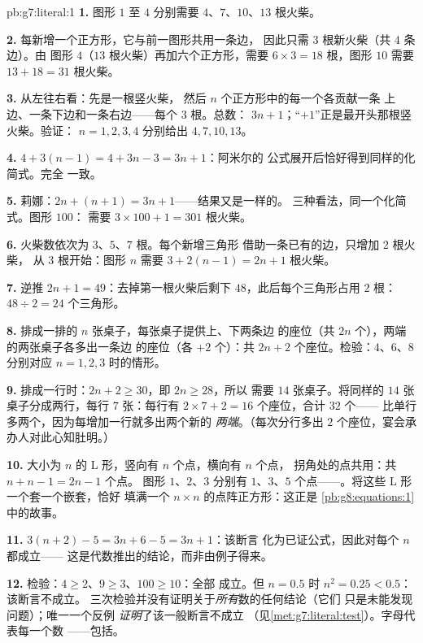 \begin{solution}{pb:g7:literal:1}
\textbf{1.} 图形 $1$ 至 $4$ 分别需要 $4$、$7$、$10$、$13$
根火柴。

\textbf{2.} 每新增一个正方形，它与前一图形共用一条边，
因此只需 $3$ 根新火柴（共 $4$ 条边）。由
图形 $4$（$13$ 根火柴）再加六个正方形，需要
$6 \times 3 = 18$ 根，图形 $10$ 需要 $13 + 18 = 31$ 根火柴。

\textbf{3.} 从左往右看：先是一根竖火柴，
然后 $n$ 个正方形中的每一个各贡献一条
上边、一条下边和一条右边——每个 $3$ 根。总数：
$3n + 1$；“$+1$”正是最开头那根竖火柴。验证：
$n = 1, 2, 3, 4$ 分别给出 $4, 7, 10, 13$。

\textbf{4.} $4 + 3(n - 1) = 4 + 3n - 3 = 3n + 1$：阿米尔的
公式展开后恰好得到同样的化简式。完全
一致。

\textbf{5.} 莉娜：$2n + (n + 1) = 3n + 1$——结果又是一样的。
三种看法，同一个化简式。图形 $100$：
需要 $3 \times 100 + 1 = 301$ 根火柴。

\textbf{6.} 火柴数依次为 $3$、$5$、$7$ 根。每个新增三角形
借助一条已有的边，只增加 $2$ 根火柴，
从 $3$ 根开始：图形 $n$ 需要 $3 + 2(n - 1) = 2n + 1$ 根火柴。

\textbf{7.} 逆推 $2n + 1 = 49$：去掉第一根火柴后剩下
$48$，此后每个三角形占用 $2$ 根：
$48 \div 2 = 24$ 个三角形。

\textbf{8.} 排成一排的 $n$ 张桌子，每张桌子提供上、下两条边
的座位（共 $2n$ 个），两端的两张桌子各多出一条边
的座位（各 $+2$ 个）：共 $2n + 2$ 个座位。检验：$4$、$6$、$8$
分别对应 $n = 1, 2, 3$ 时的情形。

\textbf{9.} 排成一行时：$2n + 2 \geq 30$，即 $2n \geq 28$，所以
需要 $14$ 张桌子。将同样的 $14$ 张桌子分成两行，每行
$7$ 张：每行有 $2 \times 7 + 2 = 16$ 个座位，合计 $32$ 个——
比单行多两个，因为每增加一行就多出两个新的
\emph{两端}。（每次分行多出 $2$ 个座位，宴会承办人对此心知肚明。）

\textbf{10.} 大小为 $n$ 的 L 形，竖向有 $n$ 个点，横向有 $n$ 个点，
拐角处的点共用：共 $n + n - 1 = 2n - 1$ 个点。
图形 $1$、$2$、$3$ 分别有 $1$、$3$、$5$ 个点——\emph{}。将这些 L 形一个套一个嵌套，恰好
填满一个 $n \times n$ 的点阵正方形：这正是
\cref{pb:g8:equations:1}中的故事。

\textbf{11.} $3(n + 2) - 5 = 3n + 6 - 5 = 3n + 1$：该断言
化为已证公式，因此对每个 $n$ 都成立——
这是代数推出的结论，而非由例子得来。

\textbf{12.} 检验：$4 \geq 2$、$9 \geq 3$、$100 \geq 10$：全部
成立。但 $n = 0.5$ 时 $n^2 = 0.25 < 0.5$：该断言不成立。
三次检验并没有证明关于\emph{所有}数的任何结论（它们
只是未能发现问题）；唯一一个反例
\emph{证明}了该一般断言不成立
（见\cref{met:g7:literal:test}）。字母代表每一个数
——包括。


\end{solution}

